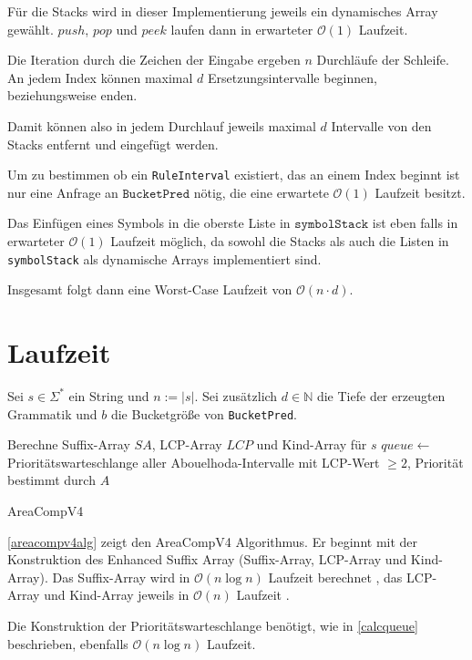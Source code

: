 Für die Stacks wird in dieser Implementierung jeweils ein dynamisches Array gewählt. $push$, $pop$ und $peek$ laufen dann in erwarteter $\mathcal{O}(1)$ Laufzeit.

Die Iteration durch die Zeichen der Eingabe ergeben $n$ Durchläufe der Schleife.
An jedem Index können maximal $d$ Ersetzungsintervalle beginnen, beziehungsweise enden.

Damit können also in jedem Durchlauf jeweils maximal $d$ Intervalle von den Stacks entfernt und eingefügt werden.

Um zu bestimmen ob ein \texttt{RuleInterval} existiert, das an einem Index beginnt ist nur eine Anfrage an $\texttt{BucketPred}$ nötig, die eine erwartete $\mathcal{O}(1)$ Laufzeit besitzt.

Das Einfügen eines Symbols in die oberste Liste in $\texttt{symbolStack}$ ist eben falls in erwarteter $\mathcal{O}(1)$ Laufzeit möglich, da sowohl die Stacks als auch die Listen in \texttt{symbolStack} als dynamische Arrays implementiert sind.

Insgesamt folgt dann eine Worst-Case Laufzeit von $\mathcal{O}(n \cdot d)$.

\section{Laufzeit}

Sei $s \in \Sigma^*$ ein String und $n := |s|$. Sei zusätzlich $d \in \mathbb{N}$ die Tiefe der erzeugten Grammatik und $b$ die Bucketgröße von \texttt{BucketPred}.

\begin{algorithm}[t]
    Berechne Suffix-Array $SA$, LCP-Array $LCP$ und Kind-Array für $s$\;
    $queue \leftarrow$ Prioritätswarteschlange aller Abouelhoda-Intervalle mit LCP-Wert $\geq 2$, Priorität bestimmt durch $A$\;
    \caption{AreaCompV4}
    \label{areacompv4alg}
\end{algorithm}


\autoref{areacompv4alg} zeigt den AreaCompV4 Algorithmus.
Er beginnt mit der Konstruktion des Enhanced Suffix Array (Suffix-Array, LCP-Array und Kind-Array). Das Suffix-Array wird in $\mathcal{O}(n \log n)$ Laufzeit berechnet \cite{larsson_faster_2007}, das LCP-Array und Kind-Array jeweils in $\mathcal{O}(n)$ Laufzeit \cite{kasai_linear-time_2001, abouelhoda_optimal_2002}.

Die Konstruktion der Prioritätswarteschlange benötigt, wie in \autoref{calcqueue} beschrieben, ebenfalls $\mathcal{O}(n \log n)$ Laufzeit.

